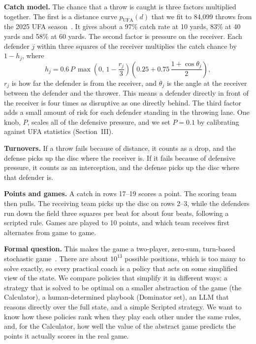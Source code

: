 \documentclass[conference]{IEEEtran}
\begin{document}
\textbf{Catch model.} The chance that a throw is caught is three factors multiplied together. The first is a distance curve $p_{\text{UFA}}(d)$ that we fit to 84,099 throws from the 2025 UFA season~\cite{ufa}. It gives about a 97\% catch rate at 10 yards, 83\% at 40 yards and 58\% at 60 yards. The second factor is pressure on the receiver. Each defender $j$ within three squares of the receiver multiplies the catch chance by $1-h_j$, where
\begin{equation}
h_j = 0.6\,P\,\max\!\left(0,\,1-\frac{r_j}{3}\right)\left(0.25+0.75\,\frac{1+\cos\theta_j}{2}\right),
\end{equation}
$r_j$ is how far the defender is from the receiver, and $\theta_j$ is the angle at the receiver between the defender and the thrower. This means a defender directly in front of the receiver is four times as disruptive as one directly behind. The third factor adds a small amount of risk for each defender standing in the throwing lane. One knob, $P$, scales all of the defensive pressure, and we set $P=0.1$ by calibrating against UFA statistics (Section~III).

\textbf{Turnovers.} If a throw fails because of distance, it counts as a drop, and the defense picks up the disc where the receiver is. If it fails because of defensive pressure, it counts as an interception, and the defense picks up the disc where that defender is.

\textbf{Points and games.} A catch in rows 17--19 scores a point. The scoring team then pulls. The receiving team picks up the disc on rows 2--3, while the defenders run down the field three squares per beat for about four beats, following a scripted rule. Games are played to 10 points, and which team receives first alternates from game to game.

\textbf{Formal question.} This makes the game a two-player, zero-sum, turn-based stochastic game~\cite{shapley1953}. There are about $10^{13}$ possible positions, which is too many to solve exactly, so every practical coach is a policy that acts on some simplified view of the state. We compare policies that simplify it in different ways: a strategy that is solved to be optimal on a smaller abstraction of the game (the Calculator), a human-determined playbook (Dominator set), an LLM that reasons directly over the full state, and a simple Scripted strategy. We want to know how these policies rank when they play each other under the same rules, and, for the Calculator, how well the value of the abstract game predicts the points it actually scores in the real game.
\end{document}

